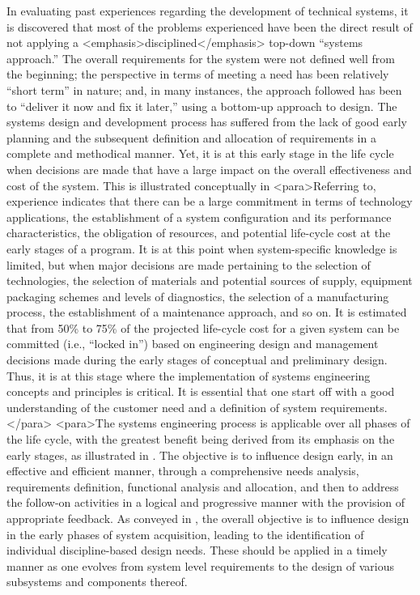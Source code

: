 In evaluating past experiences regarding the development of technical systems, it is discovered that most of the problems experienced have been the direct result of not applying a <emphasis>disciplined</emphasis> top-down “systems approach.” The overall requirements for the system were not defined well from the beginning; the perspective in terms of meeting a need has been relatively “short term” in nature; and, in many instances, the approach followed has been to “deliver it now and fix it later,” using a bottom-up approach to design. The systems design and development process has suffered from the lack of good early planning and the subsequent definition and allocation of requirements in a complete and methodical manner. Yet, it is at this early stage in the life cycle when decisions are made that have a large impact on the overall effectiveness and cost of the system. This is illustrated conceptually in 
<para>Referring to, experience indicates that there can be a large commitment in terms of technology applications, the establishment of a system configuration and its performance characteristics, the obligation of resources, and potential life-cycle cost at the early stages of a program. It is at this point when system-specific knowledge is limited, but when major decisions are made pertaining to the selection of technologies, the selection of materials and potential sources of supply, equipment packaging schemes and levels of diagnostics, the selection of a manufacturing process, the establishment of a maintenance approach, and so on. It is estimated that from 50\% to 75\% of the projected life-cycle cost for a given system can be committed (i.e., “locked in”) based on engineering design and management decisions made during the early stages of conceptual and preliminary design. Thus, it is at this stage where the implementation of systems engineering concepts and principles is critical. It is essential that one start off with a good understanding of the customer need and a definition of system requirements.</para>
<para>The systems engineering process is applicable over all phases of the life cycle, with the greatest benefit being derived from its emphasis on the early stages, as illustrated in . The objective is to influence design early, in an effective and efficient manner, through a comprehensive needs analysis, requirements definition, functional analysis and allocation, and then to address the follow-on activities in a logical and progressive manner with the provision of appropriate feedback. As conveyed in , the overall objective is to influence design in the early phases of system acquisition, leading to the identification of individual discipline-based design needs. These should be applied in a timely manner as one evolves from system level requirements to the design of various subsystems and components thereof.

